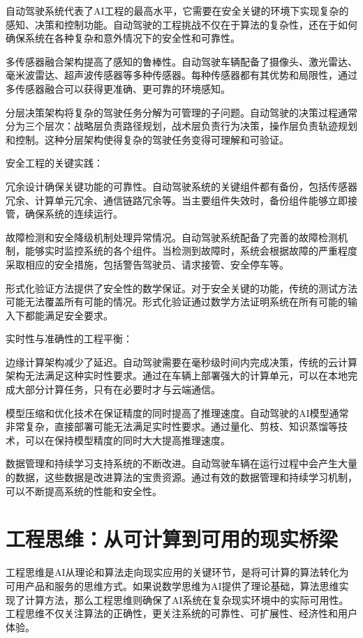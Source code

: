 自动驾驶系统代表了AI工程的最高水平，它需要在安全关键的环境下实现复杂的感知、决策和控制功能。自动驾驶的工程挑战不仅在于算法的复杂性，还在于如何确保系统在各种复杂和意外情况下的安全性和可靠性。

多传感器融合架构提高了感知的鲁棒性。自动驾驶车辆配备了摄像头、激光雷达、毫米波雷达、超声波传感器等多种传感器。每种传感器都有其优势和局限性，通过多传感器融合可以获得更准确、更可靠的环境感知。

分层决策架构将复杂的驾驶任务分解为可管理的子问题。自动驾驶的决策过程通常分为三个层次：战略层负责路径规划，战术层负责行为决策，操作层负责轨迹规划和控制。这种分层架构使得复杂的驾驶任务变得可理解和可验证。

安全工程的关键实践：

冗余设计确保关键功能的可靠性。自动驾驶系统的关键组件都有备份，包括传感器冗余、计算单元冗余、通信链路冗余等。当主要组件失效时，备份组件能够立即接管，确保系统的连续运行。

故障检测和安全降级机制处理异常情况。自动驾驶系统配备了完善的故障检测机制，能够实时监控系统的各个组件。当检测到故障时，系统会根据故障的严重程度采取相应的安全措施，包括警告驾驶员、请求接管、安全停车等。

形式化验证方法提供了安全性的数学保证。对于安全关键的功能，传统的测试方法可能无法覆盖所有可能的情况。形式化验证通过数学方法证明系统在所有可能的输入下都能满足安全要求。

实时性与准确性的工程平衡：

边缘计算架构减少了延迟。自动驾驶需要在毫秒级时间内完成决策，传统的云计算架构无法满足这种实时性要求。通过在车辆上部署强大的计算单元，可以在本地完成大部分计算任务，只有在必要时才与云端通信。

模型压缩和优化技术在保证精度的同时提高了推理速度。自动驾驶的AI模型通常非常复杂，直接部署可能无法满足实时性要求。通过量化、剪枝、知识蒸馏等技术，可以在保持模型精度的同时大大提高推理速度。

数据管理和持续学习支持系统的不断改进。自动驾驶车辆在运行过程中会产生大量的数据，这些数据是改进算法的宝贵资源。通过有效的数据管理和持续学习机制，可以不断提高系统的性能和安全性。

\section{工程思维：从可计算到可用的现实桥梁}

工程思维是AI从理论和算法走向现实应用的关键环节，是将可计算的算法转化为可用产品和服务的思维方式。如果说数学思维为AI提供了理论基础，算法思维实现了计算方法，那么工程思维则确保了AI系统在复杂现实环境中的实际可用性。工程思维不仅关注算法的正确性，更关注系统的可靠性、可扩展性、经济性和用户体验。

